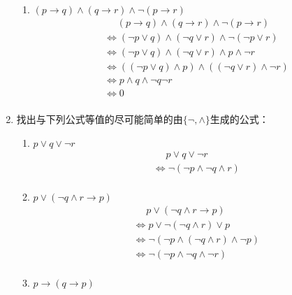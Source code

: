 \documentclass[UTF8]{ctexart}
\begin{document}
\begin{enumerate}
\begin{enumerate}
        \item $ ( p \rightarrow q) \wedge  (q \rightarrow r) \wedge  \neg ( p \rightarrow r)$
        \[
            \begin{aligned}
                &\mathrel{\phantom{=}}  ( p \rightarrow q) \wedge  (q \rightarrow r) \wedge  \neg ( p \rightarrow r)\\
                &\Leftrightarrow (\neg p \vee q)\wedge (\neg q \vee r)\wedge \neg (\neg p \vee r)\\
                &\Leftrightarrow (\neg p \vee q)\wedge (\neg q \vee r )\wedge p \wedge \neg r\\
                &\Leftrightarrow ((\neg p \vee q)\wedge p) \wedge ((\neg q \vee r)\wedge \neg r)\\
                &\Leftrightarrow p \wedge q\wedge \neg q \neg r\\
                &\Leftrightarrow 0\\
            \end{aligned}
        \]
    \end{enumerate}
    \item  找出与下列公式等值的尽可能简单的由$\{\neg, \wedge\}$生成的公式：
    \begin{enumerate}
        \item $p \vee q \vee\neg r$
        \[
            \begin{aligned}
                &\mathrel{\phantom{=}} p \vee q \vee\neg r\\
                &\Leftrightarrow \neg(\neg p \wedge \neg q \wedge r)\\
            \end{aligned}        
        \]
        \item $p \vee (\neg  q \wedge  r \rightarrow  p )$
        \[
            \begin{aligned}
                &\mathrel{\phantom{=}} p \vee (\neg  q \wedge  r \rightarrow  p )\\
                &\Leftrightarrow p \vee \neg(\neg q \wedge r)\vee p\\
                &\Leftrightarrow \neg(\neg p \wedge (\neg q \wedge r) \wedge \neg p)\\
                &\Leftrightarrow \neg(\neg p \wedge \neg q \wedge \neg r)\\
            \end{aligned}  
        \]
        \item $p \rightarrow ( q \rightarrow  p)$
        \[
            \begin{aligned}

\end{aligned}\]
\end{enumerate}
\end{enumerate}
\end{document}
